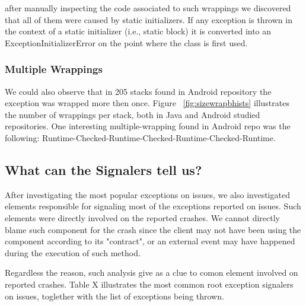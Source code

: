 \documentclass[conference]{IEEEtran}
\begin{document}
after manually inspecting the code associated to such wrappings we discovered that all of them were 
caused by static initializers. If any exception is thrown in the context of a static initializer (i.e., static block) 
it is converted into an ExceptionInitializerError on the point where the class is first used.




\subsubsection{Multiple Wrappings}

We could also observe that in 205 stacks found in Android repository the exception was wrapped 
more then once. Figure ~\ref{fig:sizewrapbhists}  illustrates the number of wrappings per stack, both
 in Java and Android studied repositories. One interesting multiple-wrapping found in Android repo was the 
following: Runtime-Checked-Runtime-Checked-Runtime-Checked-Runtime.

\subsection{What can the Signalers tell us?}

After investigating the most popular exceptions on issues, we also investigated elements
responsible for signaling most of the exceptions reported on issues.
Such elements were directly involved on the reported crashes. We cannot
directly blame such component for the crash since the client may not have been
using the component according to its "contract", or an external event
may have happened during the execution of such method.

Regardless the reason, such analysis give as a clue to comon element involved on 
reported crashes. Table X illustrates the most common root exception signalers
on issues, toglether with the list of exceptions being thrown.

\end{document}
